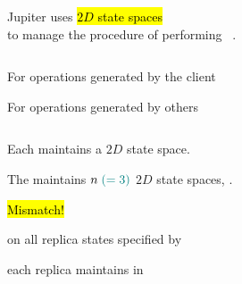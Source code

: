 \begin{frame}{}
  \begin{center}
    {\large Jupiter uses \hl{$2D$ state spaces}~ \\[5pt]
    to manage the procedure of performing ~.}
  \end{center}


  \begin{center}
  \end{center}

  \pause
  \vspace{-0.30cm}
  \begin{columns}
      \begin{description}
	\item[\textsc{Local} Dimension:] For operations generated by the client
	\item[\textsc{Global} Dimension:] For operations generated by others
      \end{description}
  \end{columns}
\end{frame}

\begin{frame}{}
  \centerline{\large Each  maintains a $2D$ state space.}


  \centerline{\large The  maintains $n \; \textcolor{teal}{(=3)}$ $2D$ state spaces, .}
\end{frame}

\begin{frame}{}
  \begin{center}
    \hl{\Huge Mismatch!}
    
    \vspace{1.00cm}
    {\large {} on all replica states specified by \blue{\wlspec{}}}

    \vspace{0.20cm}
    \vspace{0.20cm}

    {\large {} each replica maintains in }
  \end{center}
\end{frame}
